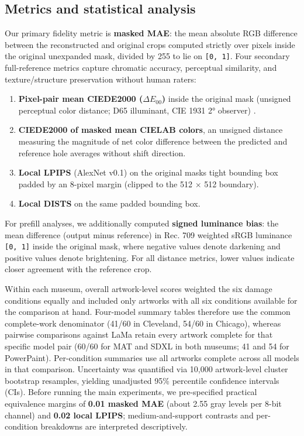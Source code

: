 \documentclass[fleqn,12pt,lineno]{wlpeerj}
\providecommand{\tightlist}{\setlength{\itemsep}{0pt}\setlength{\parskip}{0pt}}
\begin{document}
\subsection{Metrics and statistical analysis}\label{metrics-and-statistical-analysis}

Our primary fidelity metric is \textbf{masked MAE}: the mean absolute RGB difference between the reconstructed and original crops computed strictly over pixels inside the original unexpanded mask, divided by 255 to lie on \texttt{{[}0,\ 1{]}}. Four secondary full-reference metrics capture chromatic accuracy, perceptual similarity, and texture/structure preservation without human raters:

\begin{enumerate}
\def\labelenumi{\arabic{enumi}.}
\tightlist
\item
  \textbf{Pixel-pair mean CIEDE2000 (\texttt{\ensuremath{\Delta E_{00}}})} inside the original mask (unsigned perceptual color distance; D65 illuminant, CIE 1931 2° observer) \citep{luo2001ciede2000, sharma2005ciede2000}.
\item
  \textbf{CIEDE2000 of masked mean CIELAB colors}, an unsigned distance measuring the magnitude of net color difference between the predicted and reference hole averages without shift direction.
\item
  \textbf{Local LPIPS} (AlexNet v0.1) \citep{zhang2018lpips} on the original mask\textquotesingle s tight bounding box padded by an 8-pixel margin (clipped to the 512 \ensuremath{\times} 512 boundary).
\item
  \textbf{Local DISTS} \citep{ding2020dists} on the same padded bounding box.
\end{enumerate}

For prefill analyses, we additionally computed \textbf{signed luminance bias}: the mean difference (output minus reference) in Rec. 709 weighted sRGB luminance \texttt{{[}0,\ 1{]}} inside the original mask, where negative values denote darkening and positive values denote brightening. For all distance metrics, lower values indicate closer agreement with the reference crop.

Within each museum, overall artwork-level scores weighted the six damage conditions equally and included only artworks with all six conditions available for the comparison at hand. Four-model summary tables therefore use the common complete-work denominator (41/60 in Cleveland, 54/60 in Chicago), whereas pairwise comparisons against LaMa retain every artwork complete for that specific model pair (60/60 for MAT and SDXL in both museums; 41 and 54 for PowerPaint). Per-condition summaries use all artworks complete across all models in that comparison. Uncertainty was quantified via 10,000 artwork-level cluster bootstrap resamples, yielding unadjusted 95\% percentile confidence intervals (CIs). Before running the main experiments, we pre-specified practical equivalence margins of \textbf{0.01 masked MAE} (about 2.55 gray levels per 8-bit channel) and \textbf{0.02 local LPIPS}; medium-and-support contrasts and per-condition breakdowns are interpreted descriptively.
\end{document}
